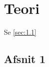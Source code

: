 \chapter{Teori}
\label{Ch:1}

Se \vref{sec:1.1}

\lipsum*

\section{Afsnit 1}
\label{sec:1.1}

\lipsum*